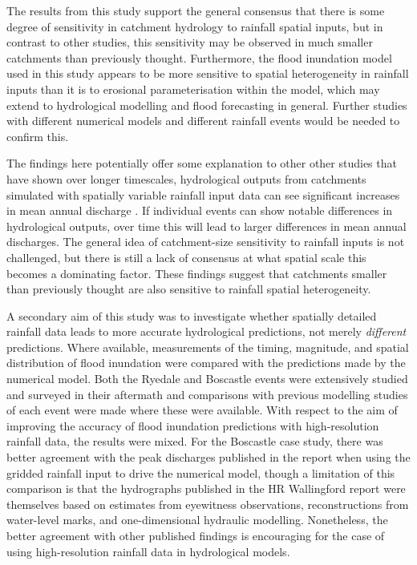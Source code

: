 The results from this study support the general consensus that there is some degree of sensitivity in catchment hydrology to rainfall spatial inputs, but in contrast to other studies, this sensitivity may be observed in much smaller catchments than previously thought. Furthermore, the flood inundation model used in this study appears to be more sensitive to spatial heterogeneity in rainfall inputs than it is to erosional parameterisation within the model, which may extend to hydrological modelling and flood forecasting in general. Further studies with different numerical models and different rainfall events would be needed to confirm this. 

The findings here potentially offer some explanation to other other studies that have shown over longer timescales, hydrological outputs from catchments simulated with spatially variable rainfall input data can see significant increases in mean annual discharge \citep{coulthard2016sensitivity}. If individual events can show notable differences in hydrological outputs, over time this will lead to larger differences in mean annual discharges. The general idea of catchment-size sensitivity to rainfall inputs is not challenged, but there is still a lack of consensus at what spatial scale this becomes a dominating factor. These findings suggest that catchments smaller than previously thought are also sensitive to rainfall spatial heterogeneity.

A secondary aim of this study was to investigate whether spatially detailed rainfall data leads to more accurate hydrological predictions, not merely \textit{different} predictions. Where available, measurements of the timing, magnitude, and spatial distribution of flood inundation were compared with the predictions made by the numerical model. Both the Ryedale and Boscastle events were extensively studied and surveyed in their aftermath and comparisons with previous modelling studies of each event were made where these were available. With respect to the aim of improving the accuracy of flood inundation predictions with high-resolution rainfall data, the results were mixed. For the Boscastle case study, there was better agreement with the peak discharges published in the \citet{wallingford2005flooding} report when using the gridded rainfall input to drive the numerical model, though a limitation of this comparison is that the hydrographs published in the HR Wallingford report were themselves based on estimates from eyewitness observations, reconstructions from water-level marks, and one-dimensional hydraulic modelling. Nonetheless, the better agreement with other published findings is encouraging for the case of using high-resolution rainfall data in hydrological models.

